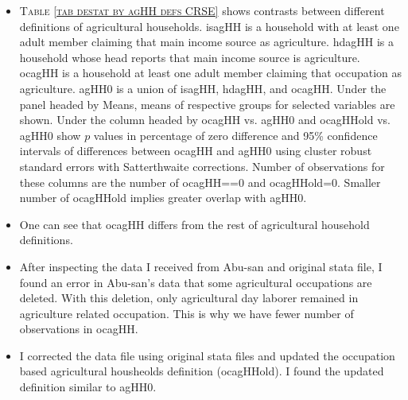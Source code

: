 \begin{itemize}
\vspace{1.0ex}\setlength{\itemsep}{1.0ex}\setlength{\baselineskip}{12pt}
\item	\textsc{\normalsize Table \ref{tab destat by agHH defs CRSE}} shows contrasts between different definitions of agricultural households. \textsf{isagHH} is a household with at least one adult member claiming that main income source as agriculture. \textsf{hdagHH} is a household whose head reports that main income source is agriculture. \textsf{ocagHH} is a household at least one adult member claiming that occupation as agriculture. \textsf{agHH0} is a union of \textsf{isagHH}, \textsf{hdagHH}, and \textsf{ocagHH}. Under the panel headed by \textsf{Means}, means of respective groups for selected variables are shown. Under the column headed by \textsf{ocagHH vs. agHH0} and \textsf{ocagHHold vs. agHH0} show $p$ values in percentage of zero difference and 95\% confidence intervals of differences between \textsf{ocagHH} and \textsf{agHH0} using cluster robust standard errors with Satterthwaite corrections. Number of observations for these columns are the number of \textsf{ocagHH==0} and \textsf{ocagHHold=0}. Smaller number of \textsf{ocagHHold} implies greater overlap with \textsf{agHH0}. 
\item	One can see that \textsf{ocagHH} differs from the rest of agricultural household definitions. %
\item	After inspecting the data I received from Abu-san and original stata file, I found an error in Abu-san's data that some agricultural occupations are deleted. With this deletion, only agricultural day laborer remained in agriculture related occupation. This is why we have fewer number of observations in \textsf{ocagHH}. 
\item	I corrected the data file using original stata files and updated the occupation based agricultural housheolds definition (\textsf{ocagHHold}). I found the updated definition similar to \textsf{agHH0}.
\end{itemize}

